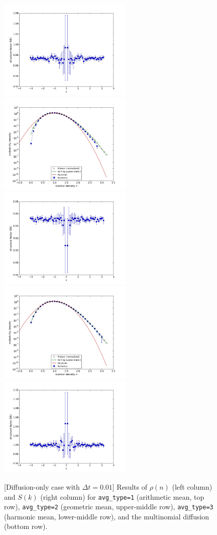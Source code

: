 \documentclass{article}
\begin{document}
\begin{figure}
\includegraphics[width=0.5\linewidth,height=1.9in]{fig1/appendix_dt0.01_diff_Sk_avg2.jpg}
\includegraphics[width=0.5\linewidth,height=1.9in]{fig1/appendix_dt0.01_diff_hist_avg3.jpg}
\includegraphics[width=0.5\linewidth,height=1.9in]{fig1/appendix_dt0.01_diff_Sk_avg3.jpg}
\includegraphics[width=0.5\linewidth,height=1.9in]{fig1/appendix_dt0.01_diff_hist_mn.jpg}
\includegraphics[width=0.5\linewidth,height=1.9in]{fig1/appendix_dt0.01_diff_Sk_mn.jpg}
\caption{\label{fig_appendix_diff_avg_type}[Diffusion-only case with $\Delta t=0.01$] Results of $\rho(n)$ (left column) and $S(k)$ (right column) for \texttt{avg\_type=1} (arithmetic mean, top row), \texttt{avg\_type=2} (geometric mean, upper-middle row), \texttt{avg\_type=3} (harmonic mean, lower-middle row), and the multinomial diffusion (bottom row).
}
\end{figure}
\end{document}
